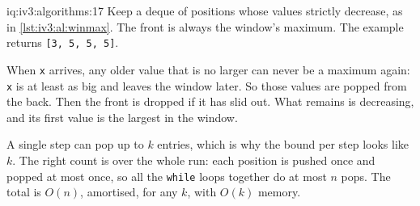 \begin{solution}{iq:iv3:algorithms:17}
Keep a deque of positions whose values strictly decrease, as in \cref{lst:iv3:al:winmax}. The front is always the window's maximum. The example returns \texttt{[3, 5, 5, 5]}.
\label{lst:iv3:al:winmax}

When \texttt{x} arrives, any older value that is no larger can never be a maximum again: \texttt{x} is at least as big and leaves the window later. So those values are popped from the back. Then the front is dropped if it has slid out. What remains is decreasing, and its first value is the largest in the window.

A single step can pop up to $k$ entries, which is why the bound per step looks like $k$. The right count is over the whole run: each position is pushed once and popped at most once, so all the \texttt{while} loops together do at most $n$ pops. The total is $O(n)$, amortised, for any $k$, with $O(k)$ memory.

\end{solution}

